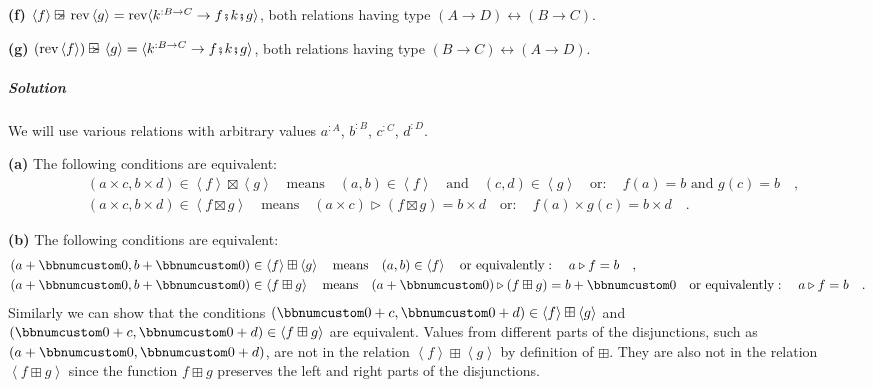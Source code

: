 \textbf{(f)} $\left<f\right>\ogreaterthan\text{rev}\left<g\right>=\text{rev}\langle k^{:B\rightarrow C}\rightarrow f\bef k\bef g\rangle$,
both relations having type $\left(A\rightarrow D\right)\leftrightarrow\left(B\rightarrow C\right)$.

\textbf{(g)} $(\text{rev}\left<f\right>)\ogreaterthan\left<g\right>=\langle k^{:B\rightarrow C}\rightarrow f\bef k\bef g\rangle$,
both relations having type $\left(B\rightarrow C\right)\leftrightarrow\left(A\rightarrow D\right)$.

\subparagraph{Solution}

We will use various relations with arbitrary values $a^{:A}$, $b^{:B}$,
$c^{:C}$, $d^{:D}$.

\textbf{(a)} The following conditions are equivalent:
\begin{align*}
 & (a\times c,b\times d)\in\left<f\right>\boxtimes\left<g\right>\quad\text{means}\quad(a,b)\in\left<f\right>\quad\text{and}\quad(c,d)\in\left<g\right>\quad\text{or}:\quad f(a)=b\text{ and }g(c)=b\quad,\\
 & (a\times c,b\times d)\in\left<f\boxtimes g\right>\quad\text{means}\quad(a\times c)\triangleright(f\boxtimes g)=b\times d\quad\text{or}:\quad f(a)\times g(c)=b\times d\quad.
\end{align*}

\textbf{(b)} The following conditions are equivalent:
\begin{align*}
 & (a+\bbnum 0,b+\bbnum 0)\in\left<f\right>\boxplus\left<g\right>\quad\text{means}\quad(a,b)\in\left<f\right>\quad\text{or equivalently}:\quad a\triangleright f=b\quad,\\
 & (a+\bbnum 0,b+\bbnum 0)\in\left<f\boxplus g\right>\quad\text{means}\quad(a+\bbnum 0)\triangleright(f\boxplus g)=b+\bbnum 0\quad\text{or equivalently}:\quad a\triangleright f=b\quad.
\end{align*}
Similarly we can show that the conditions $(\bbnum 0+c,\bbnum 0+d)\in\left<f\right>\boxplus\left<g\right>$
and $(\bbnum 0+c,\bbnum 0+d)\in\left<f\boxplus g\right>$ are equivalent.
Values from different parts of the disjunctions, such as $(a+\bbnum 0,\bbnum 0+d)$,
are not in the relation $\left<f\right>\boxplus\left<g\right>$ by
definition of $\boxplus$. They are also not in the relation $\left<f\boxplus g\right>$
since the function $f\boxplus g$ preserves the left and right parts
of the disjunctions.

